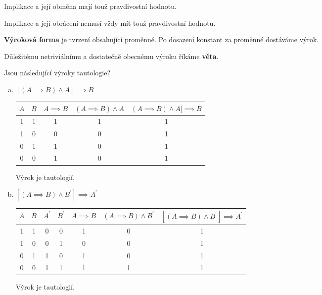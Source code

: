 \begin{veta}
  Implikace a její obměna mají touž pravdivostní hodnotu.
\end{veta}

\begin{pozn}
  Implikace a její obrácení nemusí vždy mít touž pravdivostní hodnotu.
\end{pozn}

\begin{definition}
  \textbf{Výroková forma} je tvrzení obsahující proměnné. Po dosazení konstant za proměnné dostáváme výrok.
\end{definition}

\begin{pozn}
  Důležitému netriviálnímu a dostatečně obecnému výroku říkáme \textbf{věta}.
\end{pozn}

\begin{example}[SMP 143/4]
  Jsou následující výroky tautologie?
  \rm
  \begin{enumerate}[a.]
    \item $\left[(A\implies B)\land A\right]\implies B$
    \begin{center}
      \begin{tabular}{c c | c c c}
        $A$ & $B$ & $A \implies B$ & $(A\implies B)\land A$ & $(A\implies B)\land A]\implies B$ \\
        \hline
        1 & 1 & 1 & 1 & 1 \\
        1 & 0 & 0 & 0 & 1 \\
        0 & 1 & 1 & 0 & 1 \\
        0 & 0 & 1 & 0 & 1
      \end{tabular}
    \end{center}
    Výrok je tautologií.
    \item $\left[(A\implies B)\land B^\prime\right]\implies A^\prime$
    \begin{center}
      \begin{tabular}{c c c c | c c c}
        $A$ & $B$ & $A^\prime$ & $B^\prime$ &  $A \implies B$ & $(A\implies B)\land B^\prime$ & $\left[(A\implies B)\land B^\prime\right]\implies A^\prime$ \\
        \hline
        1 & 1 & 0 & 0 & 1 & 0 & 1 \\
        1 & 0 & 0 & 1 & 0 & 0 & 1 \\
        0 & 1 & 1 & 0 & 1 & 0 & 1 \\
        0 & 0 & 1 & 1 & 1 & 1 & 1
      \end{tabular}
    \end{center}
    Výrok je tautologií.
  \end{enumerate}
\end{example}


